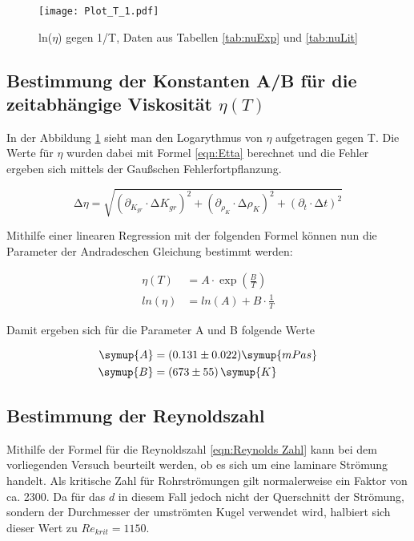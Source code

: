 \begin{figure}
  \centering
  \texttt{[image: Plot\_T\_1.pdf]}
  \caption{ln(\texorpdfstring{$\eta$}{i}) gegen 1/T, Daten aus Tabellen \ref{tab:nuExp} und \ref{tab:nuLit}}
  \label{plt:Viskos_T}
\end{figure}

\subsection{Bestimmung der Konstanten A/B für die zeitabhängige Viskosität \texorpdfstring{$\eta(T)$}{z}}

In der Abbildung \ref{plt:Viskos_T} sieht man den Logarythmus von $\eta$ aufgetragen
gegen T. Die Werte für $\eta$ wurden dabei mit Formel \eqref{eqn:Etta} berechnet und
die Fehler ergeben sich mittels der Gaußschen Fehlerfortpflanzung.

\begin{equation}
  \increment \eta = \sqrt{  \left( \partial_{K_{gr}} \cdot \increment K_{gr} \right)^2
                          + \left( \partial_{\rho_K} \cdot \increment \rho_K \right)^2
                          + \left( \partial_t        \cdot \increment t      \right)^2 }
\end{equation}

Mithilfe einer linearen Regression mit der folgenden Formel können nun
die Parameter der Andradeschen Gleichung bestimmt werden:

\begin{align}
  \eta(T)   &= A \cdot \exp(\frac{B}{T})\\
  ln (\eta) &= ln (A) + B \cdot \frac{1}{T}
\end{align}

Damit ergeben sich für die Parameter A und B folgende Werte

\begin{align}
  \symup{A} &= (0.131 \pm 0.022) \symup{mPa s}\\
  \symup{B} &= (673 \pm 55) \, \symup{K}
\end{align}

\subsection{Bestimmung der Reynoldszahl}

Mithilfe der Formel für die Reynoldszahl \eqref{eqn:Reynolds Zahl} kann bei dem
vorliegenden Versuch beurteilt werden, ob es sich um eine laminare Strömung handelt.
Als kritische Zahl für Rohrströmungen gilt normalerweise ein Faktor von ca. 2300.
Da für das $d$ in diesem Fall jedoch nicht der Querschnitt der Strömung, sondern
der Durchmesser der umströmten Kugel verwendet wird, halbiert sich dieser Wert zu
$Re_{krit} = 1150$. \cite{Reynold}

